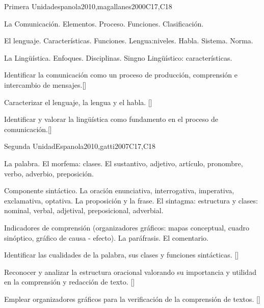 \begin{syllabus}
\begin{unit}{}{Primera Unidad}{espanola2010,magallanes2000}{}{C17,C18}
\begin{topics}
    \item La Comunicación.
		\subitem Elementos.
		\subitem Proceso.
		\subitem Funciones.
		\subitem Clasificación.
	\item El lenguaje.
		\subitem Características.
		\subitem Funciones.
		\subitem Lengua:niveles.
		\subitem Habla.
		\subitem Sistema.
		\subitem Norma.
    \item La Lingüística.
		\subitem Enfoques.
		\subitem Disciplinas.
		\subitem Singno Lingüístico: características.
    \end{topics}
	
\begin{learningoutcomes}
   \item Identificar la comunicación como un proceso de producción, comprensión e intercambio de mensajes.[\Familiarity]
   \item Caracterizar el lenguaje, la lengua y el habla. [\Familiarity]
   \item Identificar y valorar la lingüística como fundamento en el proceso de comunicación.[\Familiarity]
\end{learningoutcomes}

\end{unit}

\begin{unit}{}{Segunda Unidad}{Espanola2010,gatti2007}{}{C17,C18}
\begin{topics}
	\item La palabra.
		\subitem El morfema: clases.
		\subitem El sustantivo, adjetivo, artículo, pronombre, verbo, adverbio, preposición.
	\item Componente sintáctico.
		\subitem La oración enunciativa, interrogativa, imperativa, exclamativa, optativa.
		\subitem La proposición y la frase. 
		\subitem El sintagma: estructura y clases: nominal, verbal, adjetival, preposicional, adverbial.
	\item Indicadores de comprensión (organizadores gráficos: mapas conceptual, cuadro sinóptico, gráfico de causa - efecto).
		\subitem La paráfrasis.
		\subitem El comentario.
\end{topics}
\begin{learningoutcomes}
   \item Identificar las cualidades de la palabra,  sus clases y funciones sintácticas. [\Familiarity]
   \item Reconocer y analizar  la estructura oracional valorando su importancia y utilidad en la comprensión y redacción de texto. [\Familiarity]
   \item Emplear organizadores gráficos para la verificación de la comprensión de textos. [\Usage]
\end{learningoutcomes}
\end{unit}


\end{syllabus}
